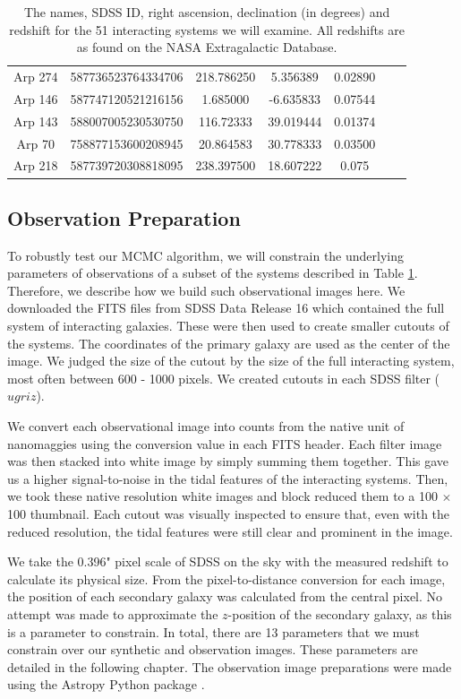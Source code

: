 \begin{table}
{\begin{tabular}{|c|c|c|c|c|c|c|}
Arp 274 & 587736523764334706 & 218.786250 & 5.356389 & 0.02890 \\
Arp 146 & 587747120521216156 & 1.685000 & -6.635833 & 0.07544 \\
Arp 143 & 588007005230530750 & 116.72333 & 39.019444 & 0.01374 \\
Arp 70 & 758877153600208945 & 20.864583 & 30.778333 & 0.03500 \\
Arp 218 & 587739720308818095 & 238.397500 & 18.607222 & 0.075 \\
\hline
\end{tabular}}
\caption[The names, SDSS ID, right ascension, declination (in degrees) and redshift for the 51 interacting systems we will examine.]{The names, SDSS ID, right ascension, declination (in degrees) and redshift for the 51 interacting systems we will examine. All redshifts are as found on the NASA Extragalactic Database.}
\label{tab:Objects}
\end{table}

\subsection{Observation Preparation}\label{data:obs-prep}
\noindent To robustly test our MCMC algorithm, we will constrain the underlying parameters of observations of a subset of the systems described in Table \ref{tab:Objects}. Therefore, we describe how we build such observational images here. We downloaded the FITS files from SDSS Data Release 16 which contained the full system of interacting galaxies. These were then used to create smaller cutouts of the systems. The coordinates of the primary galaxy are used as the center of the image. We judged the size of the cutout by the size of the full interacting system, most often between 600 - 1000 pixels. We created cutouts in each SDSS filter ($ugriz$).

We convert each observational image into counts from the native unit of nanomaggies using the conversion value in each FITS header. Each filter image was then stacked into white image by simply summing them together. This gave us a higher signal-to-noise in the tidal features of the interacting systems. Then, we took these native resolution white images and block reduced them to a 100 $\times$ 100 thumbnail. Each cutout was visually inspected to ensure that, even with the reduced resolution, the tidal features were still clear and prominent in the image.

We take the 0.396" pixel scale of SDSS on the sky with the measured redshift to calculate its physical size. From the pixel-to-distance conversion for each image, the position of each secondary galaxy was calculated from the central pixel. No attempt was made to approximate the $z$-position of the secondary galaxy, as this is a parameter to constrain. In total, there are 13 parameters that we must constrain over our synthetic and observation images. These parameters are detailed in the following chapter. The observation image preparations were made using the Astropy Python package \citep{astropy_2013, astropy_2018}.

